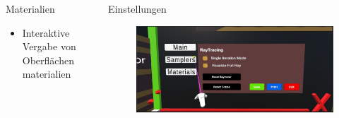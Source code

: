 \documentclass[final,hyperref={pdfpagelabels=false}]{beamer}
\begin{document}
\begin{frame}[t]
\begin{columns}[t]
\begin{column}{.465\textwidth}
\begin{block}{Materialien}

	\begin{itemize}
		\item Interaktive Vergabe von Oberflächenmaterialien
	\end{itemize}


\end{block}


\end{column} %



\begin{column}{.03\textwidth}\end{column} %

\begin{column}{.465\textwidth}

\begin{block}{Einstellungen}
   \begin{figure}
   	  \includegraphics[width=1\textwidth]{settings}
   \end{figure}
   
   \vspace{10px}
   

\end{block}
\end{column}
\end{columns}
\end{frame}
\end{document}
